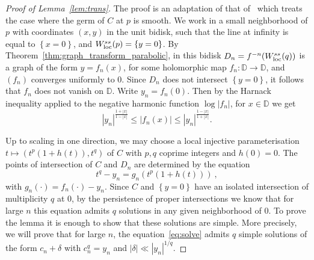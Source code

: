 \documentclass[11 pt, oneside, a4paper]{amsart}
\newcommand{\D}{\mathbb{D}}
\newcommand{\eps}{\varepsilon}
\newcommand{\loc}{\mathrm{loc}}
\newcommand{\abs}[1]{{\left|{#1}\right|}}
\newcommand{\set}[1]{{\left\{#1\right\}}}
\theoremstyle{definition}
\theoremstyle{definition}
\begin{document}
\begin{proof}[Proof of Lemma~\ref{lem:trans}]
{
The proof is an adaptation of that of~\cite[Lemma~6.4]{zbMATH00447094} which treats the case where the germ of $C$ at $p$ is smooth. 
We work in a small neighborhood of $p$ with coordinates $(x,y)$ in the unit bidisk, 
such that the line at infinity is equal to $\set{x=0}$, 
and $W^{\rm ss}_\loc(p)=\set{y=0}$. 
By Theorem~\ref{thm:graph_transform_parabolic}, in this  bidisk
$D_n= f^{-n} (W^{\rm ss}_\loc(q))$ is a graph of the form  $y=f_n(x)$, 
for some holomorphic map $f_n:\D\to \D$, and 
 $(f_n)$ converges uniformly to 0.  
Since $D_n$ does not intersect $\set{y=0}$, it follows that
$f_n$ does not vanish on $\D$. Write $y_n = f_n(0)$. Then by the Harnack inequality applied to 
the negative harmonic function $\log\abs{f_n}$, for $x\in \D$
we get 
\begin{equation}\label{eq:harnack}
\abs{y_n}^{\frac{1+\abs{x}}{1-\abs{x}}} \leq  \abs{f_n(x)}\leq \abs{y_n}^{\frac{1-\abs{x}}{1+\abs{x}}}.
\end{equation}
}

{
Up to scaling in one direction, we may choose a local injective parameterisation 
$t \mapsto (t^p(1+ h(t)), t^q)$ of $C$ with $p, q$ coprime integers and $h(0)=0$. 
The points of intersection of $C$ and $D_n$ are determined by the equation 
\begin{equation} \label{eq:solve}
t^q-y_n= g_n\left(t^p(1+ h(t))\right)~,
\end{equation}
with $g_n(\cdot)= f_n(\cdot) -y_n $. %
Since  $C$ and $\set{y=0}$  have an isolated intersection of multiplicity $q$ at $0$,
by the persistence of proper intersections 
  we know that for large $n$  this equation admits $q$ solutions in any given neighborhood of 0. 
To prove the lemma it is enough to show that these solutions are simple.  More precisely, we will 
prove that for %
  large $n$, the equation~\eqref{eq:solve} admits $q$ simple solutions of the form 
$c_n + \delta$ with $c_n^q=y_n$ and $|\delta|\ll   |y_n|^{1/q}$.}


\end{proof}
\end{document}
